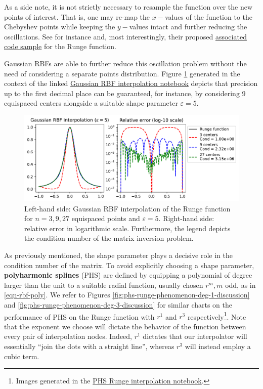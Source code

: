 \documentclass[12pt]{report} %
\begin{document}
As a side note,
it is not strictly necessary to resample the function over the new points of interest. That is, one may re-map the $x-$values of the function to the Chebyshev points while keeping the $y-$values intact and further reducing the oscillations. See for instance \cite{DEMARCHI2021125628} and, most interestingly, their proposed \href{https://github.com/pog87/FakeNodes/blob/master/Runge.ipynb}{associated code sample} for the Runge function.

Gaussian RBFs are able to further reduce this oscillation problem without the need of considering a separate points distribution. Figure \ref{fig:rbf-runge-phenomenon-eps-5-discussion} generated in the context of the linked \href{https://github.com/heqro/tfm-experiments/blob/main/introductory_notebooks/rbf_interpolation/runge_rbf.ipynb}{Gaussian RBF interpolation notebook} depicts that precision up to the first decimal place can be guaranteed, for instance, by considering 9 equispaced centers alongside a suitable shape parameter $\varepsilon=5$.

\begin{figure}[ht]
  \centering
  \includegraphics[width=\textwidth]{imagenes/rbf_interpolation/rbf_runge_5.pdf}
  \caption{Left-hand side: Gaussian RBF interpolation of the Runge function for $n=3,9,27$ equispaced points and $\varepsilon=5$. Right-hand side: relative error in logarithmic scale. Furthermore, the legend depicts the condition number of the matrix inversion problem.}
  \label{fig:rbf-runge-phenomenon-eps-5-discussion}
\end{figure}

As previously mentioned, the shape parameter plays a decisive role in the condition number of the matrix.
To avoid explicitly choosing a shape parameter, \textbf{polyharmonic splines} (PHS) are defined by equipping a polynomial of degree larger than the unit to a suitable radial function, usually chosen $r^m,m$ odd, as in \eqref{eqn-rbf-poly}. We refer to Figures \ref{fig:phs-runge-phenomenon-deg-1-discussion} and \ref{fig:phs-runge-phenomenon-deg-3-discussion} for similar charts on the performance of PHS on the Runge function with $r^1$ and $r^3$ respectively\footnote{Images generated in the \href{https://github.com/heqro/tfm-experiments/blob/main/introductory_notebooks/rbf_interpolation/runge_phs.ipynb}{PHS Runge interpolation notebook}.}. Note that the exponent we choose will dictate the behavior of the function between every pair of interpolation nodes. Indeed, $r^1$ dictates that our interpolator will essentially ``join the dots with a straight line'', whereas $r^3$ will instead employ a cubic term.
\end{document}
